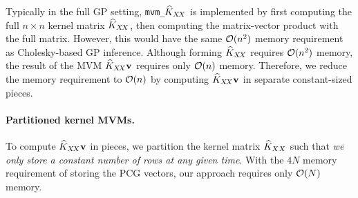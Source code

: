 Typically in the full GP setting, {\tt mvm\_$\widehat {K}_{X \! X}$} is implemented by first
computing the full $n \times n$ kernel matrix $\widehat {K}_{X \! X}$, then
computing the matrix-vector product with the full matrix. However, this would
have the same $\bigo{n^2}$ memory requirement as Cholesky-based GP inference.
Although forming $\widehat {K}_{X\!X}$ requires $\bigo{n^2}$ memory, the result of the MVM $\widehat {K}_{X\!X}
\mathbf{v}$ requires only $\bigo{n}$ memory. Therefore, we reduce the memory requirement to $\bigo{n}$
by computing $\widehat {K}_{X\!X} \mathbf{v}$ in separate constant-sized pieces.

\paragraph{Partitioned kernel MVMs.}
To compute $\widehat {K}_{X\!X} \mathbf{v}$ in pieces, we partition
the kernel matrix $\widehat {K}_{XX}$ such that \textit{we only store a constant number of rows
at any given time}. With the $4N$ memory requirement of
storing the PCG vectors, our approach requires only $\bigo{N}$ memory.

